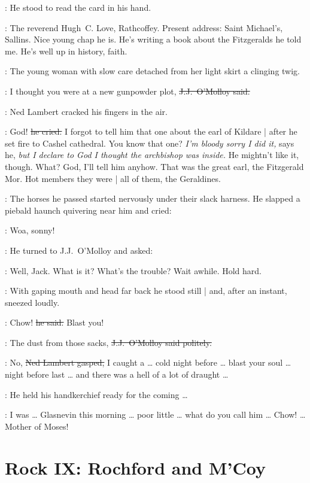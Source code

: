 :
He stood to read the card in his hand.

\lambert:
The reverend Hugh~C. Love, Rathcoffey.
Present address:
Saint Michael's, Sallins.
Nice young chap he is.
He's writing a book about the Fitzgeralds he told me.
He's well up in history, faith.

\begin{interject}
    :
    The young woman with slow care
    detached from her light skirt a clinging twig.
\end{interject}

\jjom:
I thought you were at a new gunpowder plot,
\sout{J.J.~O'Molloy said.}

:
Ned Lambert cracked his fingers in the air.

\lambert:
God!
\sout{he cried.}
I forgot to tell him that one about the earl of Kildare |
after he set fire to Cashel cathedral.
You know that one?
\emph{I'm bloody sorry I did it,}
says he,
\emph{but I declare to God I thought the archbishop was inside.}
He mightn't like it, though.
What?
God, I'll tell him anyhow.
That was the great earl, the Fitzgerald Mor.
Hot members they were |
all of them, the Geraldines.

:
The horses he passed
started nervously
under their slack harness.
He slapped a piebald haunch quivering near him and cried:

\lambert:
Woa, sonny!

:
He turned to J.J.~O'Molloy and asked:

\lambert:
Well, Jack.
What is it?
What's the trouble?
Wait awhile.
Hold hard.

:
With gaping mouth and head far back
he stood still |
and, after an instant,
sneezed loudly.

\lambert:
Chow!
\sout{he said.}
Blast you!

\jjom:
The dust from those sacks,
\sout{J.J.~O'Molloy said politely.}

\lambert:
No,
\sout{Ned Lambert gasped,}
I caught a \ldots
cold night before \ldots
blast your soul \ldots
{}
night before last \ldots
and there was a hell of a lot of draught \ldots

:
He held his handkerchief ready for the coming \ldots

\lambert:
I was \ldots
Glasnevin this morning \ldots
poor little \ldots
what do you call him \ldots
Chow! \ldots
Mother of Moses!


\section*{Rock IX: Rochford and M'Coy}


